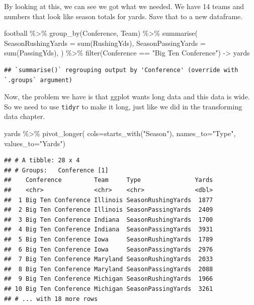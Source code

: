 \documentclass[
]{book}
\newenvironment{Shaded}{\begin{snugshade}}{\end{snugshade}}
\newcommand{\AttributeTok}[1]{\textcolor[rgb]{0.77,0.63,0.00}{#1}}
\newcommand{\FunctionTok}[1]{\textcolor[rgb]{0.00,0.00,0.00}{#1}}
\newcommand{\NormalTok}[1]{#1}
\newcommand{\OtherTok}[1]{\textcolor[rgb]{0.56,0.35,0.01}{#1}}
\newcommand{\SpecialCharTok}[1]{\textcolor[rgb]{0.00,0.00,0.00}{#1}}
\newcommand{\StringTok}[1]{\textcolor[rgb]{0.31,0.60,0.02}{#1}}
\begin{document}
By looking at this, we can see we got what we needed. We have 14 teams and numbers that look like season totals for yards. Save that to a new dataframe.

\begin{Shaded}
\begin{Highlighting}[]
\NormalTok{football }\SpecialCharTok{\%\textgreater{}\%} 
  \FunctionTok{group\_by}\NormalTok{(Conference, Team) }\SpecialCharTok{\%\textgreater{}\%} 
  \FunctionTok{summarise}\NormalTok{(}
    \AttributeTok{SeasonRushingYards =} \FunctionTok{sum}\NormalTok{(RushingYds),}
    \AttributeTok{SeasonPassingYards =} \FunctionTok{sum}\NormalTok{(PassingYds),}
\NormalTok{  ) }\SpecialCharTok{\%\textgreater{}\%} \FunctionTok{filter}\NormalTok{(Conference }\SpecialCharTok{==} \StringTok{"Big Ten Conference"}\NormalTok{) }\OtherTok{{-}\textgreater{}}\NormalTok{ yards}
\end{Highlighting}
\end{Shaded}

\begin{verbatim}
## `summarise()` regrouping output by 'Conference' (override with `.groups` argument)
\end{verbatim}

Now, the problem we have is that ggplot wants long data and this data is wide. So we need to use \texttt{tidyr} to make it long, just like we did in the transforming data chapter.

\begin{Shaded}
\begin{Highlighting}[]
\NormalTok{yards }\SpecialCharTok{\%\textgreater{}\%} 
  \FunctionTok{pivot\_longer}\NormalTok{(}
    \AttributeTok{cols=}\FunctionTok{starts\_with}\NormalTok{(}\StringTok{"Season"}\NormalTok{), }
    \AttributeTok{names\_to=}\StringTok{"Type"}\NormalTok{, }
    \AttributeTok{values\_to=}\StringTok{"Yards"}\NormalTok{)}
\end{Highlighting}
\end{Shaded}

\begin{verbatim}
## # A tibble: 28 x 4
## # Groups:   Conference [1]
##    Conference         Team     Type               Yards
##    <chr>              <chr>    <chr>              <dbl>
##  1 Big Ten Conference Illinois SeasonRushingYards  1877
##  2 Big Ten Conference Illinois SeasonPassingYards  2409
##  3 Big Ten Conference Indiana  SeasonRushingYards  1700
##  4 Big Ten Conference Indiana  SeasonPassingYards  3931
##  5 Big Ten Conference Iowa     SeasonRushingYards  1789
##  6 Big Ten Conference Iowa     SeasonPassingYards  2976
##  7 Big Ten Conference Maryland SeasonRushingYards  2033
##  8 Big Ten Conference Maryland SeasonPassingYards  2088
##  9 Big Ten Conference Michigan SeasonRushingYards  1966
## 10 Big Ten Conference Michigan SeasonPassingYards  3261
## # ... with 18 more rows
\end{verbatim}
\end{document}
